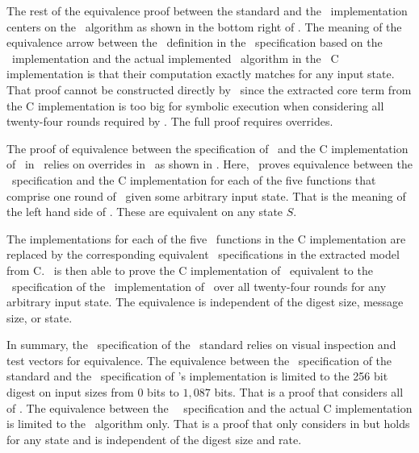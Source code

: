 The rest of the equivalence proof between the standard and the \openssl\ implementation centers on the \keccak\ algorithm as shown in the bottom right of .
The meaning of the equivalence arrow between the \keccak\ definition in the \cryptol\ specification based on the \openssl\ implementation and the actual implemented \keccak\ algorithm in the \openssl\ C implementation is that their computation exactly matches for any input state.
That proof cannot be constructed directly by \saw\ since the extracted core term from the C implementation is too big for symbolic execution when considering all twenty-four rounds required by \keccak.
The full proof requires overrides.

The proof of equivalence between the specification of \keccak\ and the C implementation of \keccak\ in \openssl\ relies on overrides in \saw\ as shown in .
Here, \saw\ proves equivalence between the \cryptol\ specification and the C implementation for each of the five functions that comprise one round of \keccak\ given some arbitrary input state.
That is the meaning of the left hand side of .
These are equivalent on any state $S$.

The implementations for each of the five \keccak\ functions in the C implementation are replaced by the corresponding equivalent \cryptol\ specifications in the extracted model from C.
\saw\ is then able to prove the C implementation of \keccak\ equivalent to the \cryptol\ specification of the \openssl\ implementation of \keccak\ over all twenty-four rounds for any arbitrary input state.
The equivalence is independent of the digest size, message size, or state.


In summary, the \cryptol\ specification of the \fips\ standard relies on visual inspection and test vectors for equivalence.
The equivalence between the \cryptol\ specification of the standard and the \cryptol\ specification of \openssl's implementation is limited to the 256 bit digest on input sizes from $0$ bits to $1,087$ bits.
That is a proof that considers all of .
The equivalence between the \openssl\ \cryptol\ specification and the actual C implementation is limited to the \keccak\ algorithm only.
That is a proof that only considers  in  but holds for any state and is independent of the digest size and rate.

